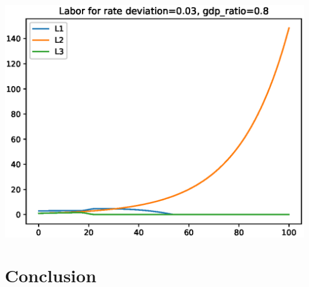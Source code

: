 \documentclass[12pt]{article}
\theoremstyle{definition}
\begin{document}
\begin{minipage}{\linewidth}
\begin{framed}
\begin{minipage}[t]{.48\textwidth}
\includegraphics[width=1\textwidth]{images/econ_1_run_4_labor}
\end{minipage}\hfill
\end{framed}
\end{minipage}

\section{Conclusion}
\end{document}
